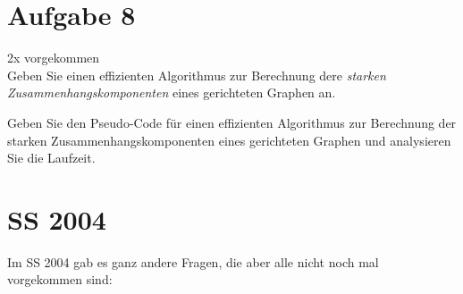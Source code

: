 \documentclass[10pt,a4paper]{article}
\begin{document}
\section*{Aufgabe 8} 
	2x vorgekommen \\
	Geben Sie einen effizienten Algorithmus zur Berechnung dere \textit{starken Zusammenhangskomponenten} eines gerichteten Graphen an.
	
	Geben Sie den Pseudo-Code für einen effizienten Algorithmus zur Berechnung der starken Zusammenhangskomponenten eines gerichteten Graphen und analysieren Sie die Laufzeit.

\section*{SS 2004}
Im SS 2004 gab es ganz andere Fragen, die aber alle nicht noch mal vorgekommen sind:
\begin{center}
\end{center}
\end{document}
